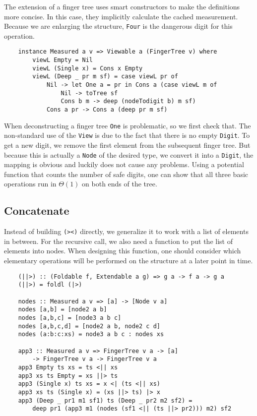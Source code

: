 The extension of a finger tree uses smart constructors to make the definitions more concise. In this case, they implicitly calculate the cached measurement. Because we are enlarging the structure, \texttt{Four} is the dangerous digit for this operation.

\begin{verbatim}
    instance Measured a v => Viewable a (FingerTree v) where
        viewL Empty = Nil
        viewL (Single x) = Cons x Empty
        viewL (Deep _ pr m sf) = case viewL pr of
            Nil -> let One a = pr in Cons a (case viewL m of
                Nil -> toTree sf
                Cons b m -> deep (nodeTodigit b) m sf)
            Cons a pr -> Cons a (deep pr m sf)
\end{verbatim}

When deconstructing a finger tree \texttt{One} is problematic, so we first check that. The non-standard use of the \texttt{View} is due to the fact that there is no empty \texttt{Digit}. To get a new digit, we remove the first element from the subsequent finger tree. But because this is actually a \texttt{Node} of the desired type, we convert it into a \texttt{Digit}, the mapping is obvious and luckily does not cause any problems. Using a potential function that counts the number of safe digits, one can show that all three basic operations run in \(\Theta(1)\) on both ends of the tree.\par

\subsection{Concatenate}

Instead of building \texttt{(><)} directly, we generalize it to work with a list of elements in between. For the recursive call, we also need a function to put the list of elements into nodes. When designing this function, one should consider which elementary operations will be performed on the structure at a later point in time.

\begin{verbatim}
    (||>) :: (Foldable f, Extendable a g) => g a -> f a -> g a
    (||>) = foldl (|>)

    nodes :: Measured a v => [a] -> [Node v a]
    nodes [a,b] = [node2 a b]
    nodes [a,b,c] = [node3 a b c]
    nodes [a,b,c,d] = [node2 a b, node2 c d]
    nodes (a:b:c:xs) = node3 a b c : nodes xs

    app3 :: Measured a v => FingerTree v a -> [a]
        -> FingerTree v a -> FingerTree v a
    app3 Empty ts xs = ts <|| xs
    app3 xs ts Empty = xs ||> ts
    app3 (Single x) ts xs = x <| (ts <|| xs)
    app3 xs ts (Single x) = (xs ||> ts) |> x
    app3 (Deep _ pr1 m1 sf1) ts (Deep _ pr2 m2 sf2) =
        deep pr1 (app3 m1 (nodes (sf1 <|| (ts ||> pr2))) m2) sf2
\end{verbatim}

